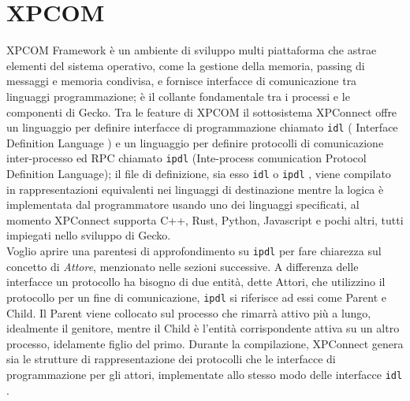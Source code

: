 \documentclass{sapthesis}
\newcommand{\code}[1]{\texttt{#1}}
\newcommand{\idl}{\code{idl} }
\newcommand{\ipdl}{\code{ipdl} }
\begin{document}
    \section{XPCOM}
        XPCOM Framework è un ambiente di sviluppo multi piattaforma che astrae elementi del sistema operativo,
        come la gestione della memoria, passing di messaggi e memoria condivisa, e fornisce interfacce di 
        comunicazione tra linguaggi programmazione; è il collante fondamentale tra i processi e le componenti di
        Gecko. Tra le feature di XPCOM il sottosistema XPConnect offre un linguaggio per definire
        interfacce di programmazione chiamato \idl ( Interface Definition Language ) e un linguaggio per definire protocolli
        di comunicazione inter-processo ed RPC chiamato \ipdl (Inte-process comunication Protocol Definition Language);
        il file di definizione, sia esso \idl o \ipdl, viene compilato in rappresentazioni equivalenti nei linguaggi
        di destinazione mentre la logica è implementata dal programmatore usando uno dei linguaggi specificati,
        al momento XPConnect supporta C++, Rust, Python, Javascript e pochi altri, tutti impiegati nello sviluppo
        di Gecko.\\
        Voglio aprire una parentesi di approfondimento su \ipdl per fare chiarezza sul concetto di \textit{Attore}, 
        menzionato nelle sezioni successive. A differenza delle interfacce un protocollo ha bisogno di due entità,
        dette Attori, che utilizzino il protocollo per un fine di comunicazione, \ipdl si riferisce ad essi come 
        Parent e Child. Il Parent viene collocato sul processo che rimarrà attivo più a lungo, idealmente il genitore, 
        mentre il Child è l'entità corrispondente attiva su un altro processo, idelamente figlio del primo.
        Durante la compilazione, XPConnect genera sia le strutture di rappresentazione dei protocolli che le
        interfacce di programmazione per gli attori, implementate allo stesso modo delle interfacce \idl.
\end{document}
